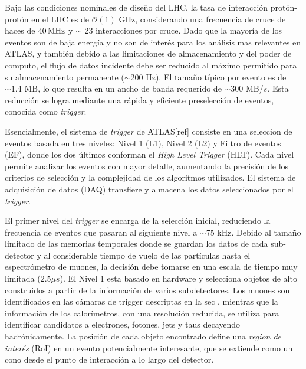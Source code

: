 Bajo las condiciones nominales de diseño del LHC, la tasa de interacción
protón-protón en el LHC es de $\mathcal{O}(1)$ GHz, considerando una
frecuencia de cruce de haces de $\unit[40]{MHz}$ y $\sim$ 23 interacciones por cruce. Dado
que la mayoría de los eventos son de baja energía y no son de interés para los
análisis mas relevantes en ATLAS, y también debido a las limitaciones de
almacenamiento y del poder de computo, el flujo de datos incidente debe ser
reducido al máximo permitido para su almacenamiento permanente ($\sim 200$ Hz).
El tamaño típico por evento es de $\sim 1.4$ MB, lo que resulta en un ancho de
banda requerido de $\sim 300$ MB/$s$. Esta reducción se logra mediante una
rápida y eficiente preselección de eventos, conocida como \emph{trigger}.

Esencialmente, el sistema de \emph{trigger} de ATLAS[ref] consiste en una seleccion
de eventos basada en tres niveles:
Nivel 1 (L1), Nivel 2 (L2) y Filtro de eventos (EF), donde
los dos últimos conforman el \emph{High Level Trigger} (HLT). Cada nivel permite
analizar los eventos con mayor detalle, aumentando la precisión de los criterios
de selección y la complejidad de los algoritmos utilizados. El sistema de
adquisición de datos (DAQ) transfiere y almacena los datos seleccionados por el
\emph{trigger}.

El primer nivel del \emph{trigger} se encarga de la selección inicial, reduciendo la
frecuencia de eventos que pasaran al siguiente nivel a $\sim 75$ kHz. Debido al
tamaño limitado de las memorias temporales donde se guardan los datos
de cada sub-detector y al considerable tiempo de vuelo de las partículas hasta el
espectrómetro de muones, la decisión debe tomarse en una escala de tiempo muy
limitada ($2.5 \mu s$). El Nivel 1 esta basado en hardware y selecciona objetos
de alto {\pt} construidos a partir de la información de varios subdetectores.
Los muones son identificados en las cámaras de trigger descriptas en la sec \XXX,
mientras que la información de los calorímetros, con una resolución reducida, se
utiliza para identificar candidatos a electrones, fotones, jets y taus decayendo
hadrónicamente. La posición de cada objeto encontrado define una \emph{region de
  interés} (RoI) en un evento potencialmente interesante, que se extiende como
un cono desde el punto de interacción a lo largo del detector.

